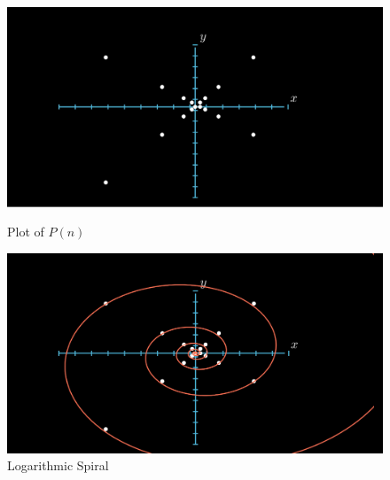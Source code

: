 \documentclass[preprint,12pt]{elsarticle}
\begin{document}
\begin{figure}[t]
	\centering
	\begin{minipage}{0.45\textwidth}
		\centering
		\includegraphics[scale=0.23, trim={3cm 0 6cm 0}, clip]{images/GFKT3.png}
		\caption{Plot of $P(n)$}
	\end{minipage}\hfill
	\begin{minipage}{0.45\textwidth}
		\centering
		\includegraphics[scale=0.23, trim={3cm 0 6cm 0}, clip]{images/GFKT4.png}
		\caption{Logarithmic Spiral}
	\end{minipage}
\end{figure}
\end{document}
